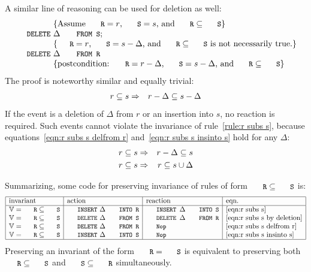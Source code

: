 \documentclass{svproc}
\begin{document}
	A similar line of reasoning can be used for deletion as well:
\[\begin{array}{r@{~}l}
&\{\text{Assume $\code{R}=r$, $\code{S}=s$, and $\code{R}\subs\code{S}$}\}\\
\code{DELETE}&\Delta\code{ FROM S};\\
&\{\text{$\code{R}=r$, $\code{S}=s-\Delta$, and $\code{R}\subs\code{S}$ is not necessarily true.}\}\\
\code{DELETE}&\Delta\code{ FROM R}\\
&\{\text{postcondition: $\code{R}=r-\Delta$, $\code{S}=s-\Delta$, and $\code{R}\subs\code{S}$}\}
\end{array}\]
	The proof is noteworthy similar and equally trivial:
\begin{eqnarray}
r\subseteq s&\Rightarrow&r-\Delta\subseteq s-\Delta\label{eqn:r subs s by deletion}
\end{eqnarray}
	If the event is a deletion of $\Delta$ from $r$ or an insertion into $s$, no reaction is required.
	Such events cannot violate the invariance of rule~\ref{rule:r subs s},
	because equations~\ref{eqn:r subs s delfrom r} and~\ref{eqn:r subs s insinto s} hold for any $\Delta$:
\begin{eqnarray}
r\subseteq s&\Rightarrow&r-\Delta\subseteq s\label{eqn:r subs s delfrom r}\\
r\subseteq s&\Rightarrow&r\subseteq s\cup\Delta\label{eqn:r subs s insinto s}
\end{eqnarray}

Summarizing, some code for preserving invariance of rules of form $\code{R}\subs\code{S}$ is:
\[\begin{array}{|l|l|l|l|}
\hline
\text{invariant}&\text{action}&\text{reaction}&\text{eqn.}\\ \hline
\full=\code{R}\subs\code{S}&\code{INSERT}\ \Delta\code{ INTO R}&\code{INSERT }\Delta\code{ INTO S}&\ref{eqn:r subs s}\\
\full=\code{R}\subs\code{S}&\code{DELETE}\ \Delta\code{ FROM S}&\code{DELETE }\Delta\code{ FROM R}&\ref{eqn:r subs s by deletion}\\
\full=\code{R}\subs\code{S}&\code{DELETE}\ \Delta\code{ FROM R}&\code{Nop}&\ref{eqn:r subs s delfrom r}\\
\full=\code{R}\subs\code{S}&\code{INSERT}\ \Delta\code{ INTO S}&\code{Nop}&\ref{eqn:r subs s insinto s}\\ \hline
\end{array}\]
Preserving an invariant of the form $\code{R}=\code{S}$ is equivalent to preserving both $\code{R}\subs\code{S}$ and $\code{S}\subs\code{R}$ simultaneously.
\end{document}

